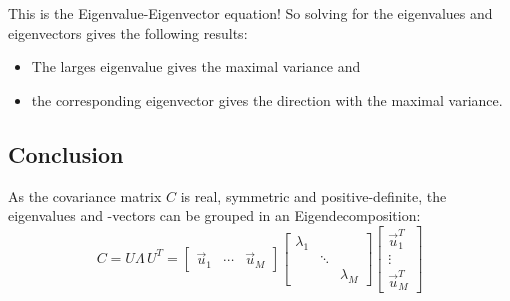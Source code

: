 				This is the Eigenvalue-Eigenvector equation! So solving for the eigenvalues and eigenvectors gives the following results:
				\begin{itemize}
					\item The larges eigenvalue gives the maximal variance and
					\item the corresponding eigenvector gives the direction with the maximal variance.
				\end{itemize}
		
		\subsection{Conclusion}
			As the covariance matrix \(C\) is real, symmetric and positive-definite, the eigenvalues and -vectors can be grouped in an Eigendecomposition:
			\begin{equation}
				C = U \Lambda \, U^T =
				\begin{bmatrix} \vec{u}_1 & \cdots & \vec{u}_M \end{bmatrix}
				\begin{bmatrix}
					\lambda_1 &        &  \\
					          & \ddots &  \\
					          &        & \lambda_M
				\end{bmatrix}
				\begin{bmatrix} \vec{u}_1^T \\ \vdots \\ \vec{u}_M^T \end{bmatrix}
			\end{equation}
			
